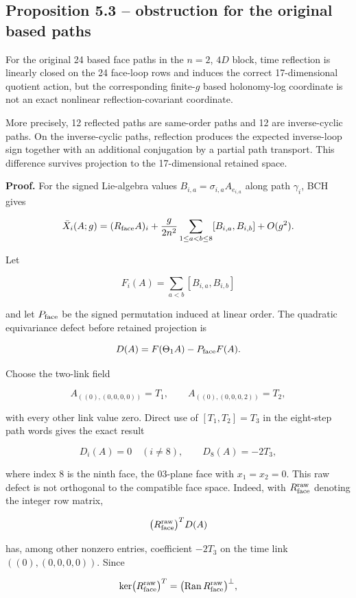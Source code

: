 \documentclass[10pt]{article}
\begin{document}
\subsection{Proposition 5.3 -- obstruction for the original based paths}

For the original 24 based face paths in the \(n=2\), \(4D\) block, time reflection is linearly closed on the 24 face-loop rows and induces the correct 17-dimensional quotient action, but the corresponding finite-\(g\) based holonomy-log coordinate is not an exact nonlinear reflection-covariant coordinate.

More precisely, 12 reflected paths are same-order paths and 12 are inverse-cyclic paths.  On the inverse-cyclic paths, reflection produces the expected inverse-loop sign together with an additional conjugation by a partial path transport.  This difference survives projection to the 17-dimensional retained space.

\textbf{Proof.}  For the signed Lie-algebra values \(B_{i,a}=\sigma_{i,a}A_{e_{i,a}}\) along path \(\gamma_i\), BCH gives

\[
\bar X_i(A;g)
=
(R_{\rm face}A)_i
+\frac{g}{2n^2}
\sum_{1\le a<b\le8}[B_{i,a},B_{i,b}]
+O(g^2).
\]

Let

\[
F_i(A)=\sum_{a<b}[B_{i,a},B_{i,b}]
\]

and let \(P_{\rm face}\) be the signed permutation induced at linear order.  The quadratic equivariance defect before retained projection is

\[
D(A)=F(\Theta_1A)-P_{\rm face}F(A).
\]

Choose the two-link field

\[
A_{((0),(0,0,0,0))}=T_1,\qquad
A_{((0),(0,0,0,2))}=T_2,
\]

with every other link value zero.  Direct use of \([T_1,T_2]=T_3\) in the eight-step path words gives the exact result

\[
D_i(A)=0\quad(i\ne8),\qquad D_8(A)=-2T_3,
\]

where index \(8\) is the ninth face, the \(03\)-plane face with \(x_1=x_2=0\).  This raw defect is not orthogonal to the compatible face space.  Indeed, with \(R_{\rm face}^{\rm raw}\) denoting the integer row matrix,

\[
\bigl(R_{\rm face}^{\rm raw}\bigr)^TD(A)
\]

has, among other nonzero entries, coefficient \(-2T_3\) on the time link \(((0),(0,0,0,0))\).  Since

\[
\ker\bigl(R_{\rm face}^{\rm raw}\bigr)^T
=
\bigl(\operatorname{Ran}R_{\rm face}^{\rm raw}\bigr)^\perp,
\]
\end{document}
